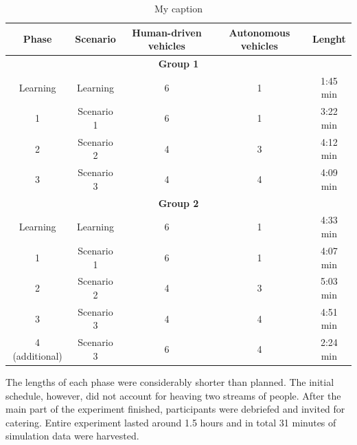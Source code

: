 \documentclass[11pt,english,twoside]{article}
\begin{document}
\begin{table}[h]
\centering
\begin{tabular}{|c|c|c|c|c|}
\hline
\textbf{Phase} & \textbf{Scenario} & \textbf{Human-driven vehicles} & \textbf{Autonomous vehicles} & \textbf{Lenght} \\ \hline
\multicolumn{5}{|c|}{\textbf{Group 1}}                                                                               \\ \hline
Learning       & Learning          & 6                              & 1                            & 1:45 min        \\ \hline
1              & Scenario 1        & 6                              & 1                            & 3:22 min        \\ \hline
2              & Scenario 2        & 4                              & 3                            & 4:12 min        \\ \hline
3              & Scenario 3        & 4                              & 4                            & 4:09 min        \\ \hline
\multicolumn{5}{|c|}{\textbf{Group 2}}                                                                               \\ \hline
Learning       & Learning          & 6                              & 1                            & 4:33 min        \\ \hline
1              & Scenario 1        & 6                              & 1                            & 4:07 min        \\ \hline
2              & Scenario 2        & 4                              & 3                            & 5:03 min        \\ \hline
3              & Scenario 3        & 4                              & 4                            & 4:51 min        \\ \hline
4 (additional) & Scenario 3        & 6                              & 4                            & 2:24 min        \\ \hline
\end{tabular}
\caption{My caption}
\label{table:minutes_table}
\end{table}

The lengths of each phase were considerably shorter than planned. The initial schedule, however, did not account for heaving two streams of people. After the main part of the experiment finished, participants were debriefed and invited for catering. Entire experiment lasted around 1.5 hours and in total 31 minutes of simulation data were harvested.
\end{document}
